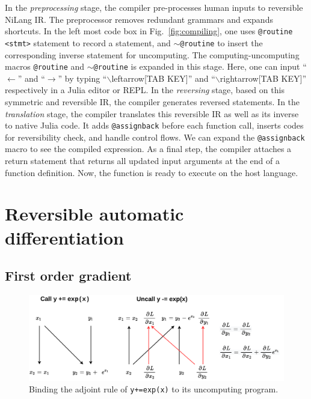 \documentclass{article}
\newcommand{\<}{\langle}
\renewcommand{\>}{\rangle}
\newcommand{\Fig}[1]{Fig.~\ref{#1}}
\theoremstyle{definition}\newtheorem{definition}{\textit{Definition}}
\begin{document}
In the \textit{preprocessing} stage, the compiler pre-processes human inputs to reversible NiLang IR.
The preprocessor removes redundant grammars and expands shortcuts. In the left most code box in \Fig{fig:compiling}, one uses \texttt{@routine <stmt>} statement to record a statement, and \texttt{$\sim$@routine} to insert the corresponding inverse statement for uncomputing.
The computing-uncomputing macros \texttt{@routine} and \texttt{$\sim$@routine} is expanded in this stage.
Here, one can input ``$\leftarrow$'' and ``$\rightarrow$'' by typing ``$\backslash$leftarrow[TAB KEY]'' and ``$\backslash$rightarrow[TAB KEY]'' respectively in a Julia editor or REPL.
In the \textit{reversing} stage, based on this symmetric and reversible IR, the compiler generates reversed statements.
In the \textit{translation} stage, the compiler translates this reversible IR as well as its inverse to native Julia code. It adds \texttt{@assignback} before each function call, inserts codes for reversibility check, and handle control flows.
We can expand the \texttt{@assignback} macro to see the compiled expression.
As a final step, the compiler attaches a return statement that returns all updated input arguments at the end of a function definition.
Now, the function is ready to execute on the host language.

\section{Reversible automatic differentiation}\label{sec:bp}

\subsection{First order gradient}\label{sec:jacobian}
\begin{figure}
    \centerline{\includegraphics[width=0.8\columnwidth,trim={0 0cm 0 0cm},clip]{reversead.pdf}}
    \caption{Binding the adjoint rule of \texttt{y+=exp(x)} to its uncomputing program.}\label{fig:reversead}
\end{figure}
\end{document}
